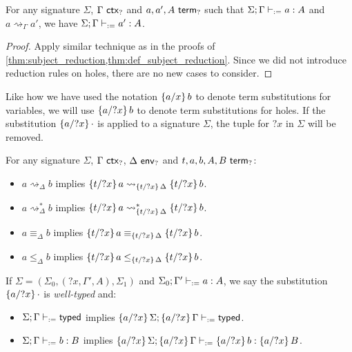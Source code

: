 \documentclass[twoside]{report}
\begin{document}
\begin{proposition}
\label{thm:hole_subject_reduction}
For any signature $\Sigma$, $\Gamma \ctxh$ and $a, a', A \termh$ such that $\Sigma; \Gamma \vdashd a : A$ and $a \rightsquigarrow_\Gamma a'$, we have $\Sigma; \Gamma \vdashd a' : A$.
\end{proposition}

\begin{proof}
Apply similar technique as in the proofs of \cref{thm:subject_reduction,thm:def_subject_reduction}. Since we did not introduce reduction rules on holes, there are no new cases to consider.
\end{proof}

Like how we have used the notation $\subst x a b$ to denote term substitutions for variables, we will use $\subst {?x} a b$ to denote term substitutions for holes. If the substitution $\subst {?x} a \cdot$ is applied to a signature $\Sigma$, the tuple for ${?x}$ in $\Sigma$ will be removed.

\begin{proposition}
\label{thm:hole_filling}
For any signature $\Sigma$, $\Gamma \ctxh$, $\Delta \envh$ and $t, a, b, A, B \termh$:
\begin{itemize}[noitemsep]
    \item $a \rightsquigarrow_\Delta b$ implies $\subst {?x} t a \rightsquigarrow_{\subst {?x} t \Delta} \subst {?x} t b$.
    \item $a \rightsquigarrow_\Delta^\ast b$ implies $\subst {?x} t a \rightsquigarrow_{\subst {?x} t \Delta}^\ast \subst {?x} t b$.
    \item $a \equiv_\Delta b$ implies $\subst {?x} t a \equiv_{\subst {?x} t \Delta} \subst {?x} t b$.
    \item $a \leq_\Delta b$ implies $\subst {?x} t a \leq_{\subst {?x} t \Delta} \subst {?x} t b$.
\end{itemize}
If $\Sigma = (\Sigma_0, ({?x}, \Gamma', A), \Sigma_1)$ and $\Sigma_0; \Gamma' \vdashd a : A$, we say the substitution $\subst {?x} a {\cdot}$ is \emph{well-typed} and:
\begin{itemize}[noitemsep]
    \item $\Sigma; \Gamma \vdashd \ok$ implies $\subst {?x} a \Sigma; \subst {?x} a \Gamma \vdashd \ok$.
    \item $\Sigma; \Gamma \vdashd b : B$ implies $\subst {?x} a \Sigma; \subst {?x} a \Gamma \vdashd \subst {?x} a b : \subst {?x} a B$.
\end{itemize}
\end{proposition}
\end{document}
